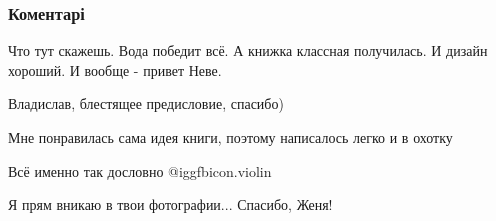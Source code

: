  
 
 
 
 
\subsubsection{Коментарі}
\label{sec:20_11_2021.fb.bilchenko_evgenia.1.zvuk_vody.cmt}

\begin{itemize} %
Что тут скажешь. Вода победит всё.
А книжка классная получилась. И дизайн хороший.
И вообще - привет Неве.

Владислав, блестящее предисловие, спасибо)

Мне понравилась сама идея книги, поэтому написалось легко и в охотку

Всё именно так дословно @igg{fbicon.violin} 

Я прям вникаю в твои фотографии... Спасибо, Женя!
\end{itemize} %
